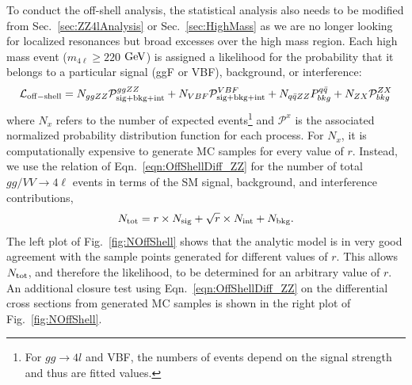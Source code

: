 To conduct the off-shell analysis, the statistical analysis also needs to be modified from Sec.~\ref{sec:ZZ4lAnalysis} or Sec.~\ref{sec:HighMass} as we are no longer looking for localized resonances but broad excesses over the high mass region. Each high mass event ($m_{4\ell}\geq220$ $\rm{GeV}$) is assigned a likelihood for the probability that it belongs to a particular signal (ggF or VBF), background, or interference:
\begin{equation}
\mathcal{L}_{\rm off-shell} = N_{ggZZ}\mathcal{P}_{\rm sig+bkg+int}^{ggZZ} + N_{VBF}\mathcal{P}_{\rm sig+bkg+int}^{VBF} + N_{q\bar{q}ZZ}P_{bkg}^{q\bar{q}} + N_{ZX}\mathcal{P}_{bkg}^{ZX}
\label{eqn:GenOffShellLikelihood}
\end{equation}
where $N_{x}$ refers to the number of expected events\footnote{For $gg\rightarrow4l$ and VBF, the numbers of events depend on the signal strength and thus are fitted values.} and $\mathcal{P}^{x}$ is the associated normalized probability distribution function for each process. For $N_{x}$, it is computationally expensive to generate MC samples for every value of $r$. Instead, we use the relation of Eqn.~\ref{eqn:OffShellDiff_ZZ} for the number of total $gg/VV \rightarrow 4\ell$ events in terms of the SM signal, background, and interference contributions,
\begin{equation}
N_{\rm tot} = r \times N_{\rm sig} + \sqrt{r}\times N_{\rm int} + N_{\rm bkg}. 
\label{eqn:NOffShell}
\end{equation}
The left plot of Fig.~\ref{fig:NOffShell} shows that the analytic model is in very good agreement with the sample points generated for different values of $r$. This allows $N_{\rm tot}$, and therefore the likelihood, to be determined for an arbitrary value of $r$. An additional closure test using Eqn.~\ref{eqn:OffShellDiff_ZZ} on the differential cross sections from generated MC samples is shown in the right plot of Fig.~\ref{fig:NOffShell}.

